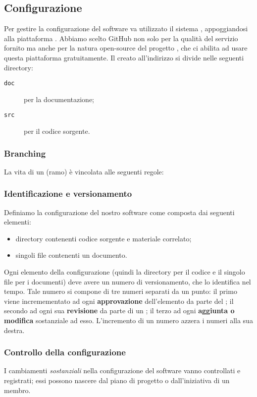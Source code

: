 	\subsection{Configurazione} \label{sec:config}
		Per gestire la configurazione del software va utilizzato il sistema , appoggiandosi alla piattaforma . Abbiamo scelto GitHub non solo per la qualità del servizio fornito ma anche per la natura open-source del progetto \proj, che ci abilita ad usare questa piattaforma gratuitamente. Il  creato all'indirizzo \repo{} si divide nelle seguenti directory:
		\begin{description}
			\item[\texttt{doc}] per la documentazione;
			\item[\texttt{src}] per il codice sorgente.
		\end{description}
		
		\subsubsection{Branching} La vita di un  (ramo) è vincolata alle seguenti regole:
		\subsubsection{Identificazione e versionamento} \label{sec:idvers}
		Definiamo la configurazione del nostro software come composta dai seguenti elementi:
		\begin{itemize}
			\item directory contenenti codice sorgente e materiale correlato;
			\item singoli file contenenti un documento.
		\end{itemize}
		Ogni elemento della configurazione (quindi la directory per il codice e il singolo file per i documenti) deve avere un numero di versionamento, che lo identifica nel tempo. Tale numero si compone di tre numeri separati da un punto: il primo viene incremementato ad ogni \textbf{approvazione} dell'elemento da parte del ; il secondo ad ogni sua \textbf{revisione} da parte di un ; il terzo ad ogni \textbf{aggiunta o modifica} sostanziale ad esso. L'incremento di un numero azzera i numeri alla sua destra.
		
		\subsubsection{Controllo della configurazione} I cambiamenti \emph{sostanziali} nella configurazione del software vanno controllati e registrati; essi possono nascere dal piano di progetto o dall'iniziativa di un membro.
